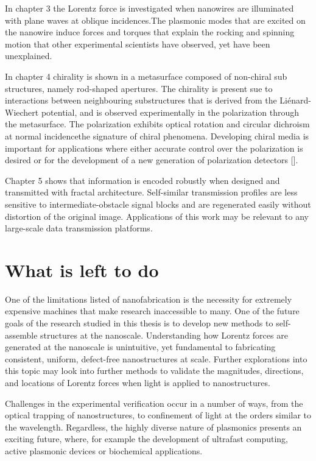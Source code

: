 In chapter 3 the Lorentz force is investigated when nanowires are illuminated with plane waves at oblique incidences.The plasmonic modes that are excited on the nanowire induce forces and torques that explain the rocking and spinning motion that other experimental scientists have observed, yet have been unexplained.

In chapter 4 chirality is shown in a metasurface composed of non-chiral sub structures, namely rod-shaped apertures.  The chirality is present sue to interactions between neighbouring substructures that is derived from the Li\'{e}nard-Wiechert potential, and is observed experimentally in the polarization through the metasurface. The polarization exhibits optical rotation and circular dichroism at normal incidence\textemdash the signature of chiral phenomena. Developing chiral media is important for applications where either accurate control over the polarization is desired or for the development of a new generation of polarization detectors [\cite{Mueller:16}].

Chapter 5 shows that information is encoded robustly when designed and transmitted with fractal architecture. Self-similar transmission profiles are less sensitive to intermediate-obstacle signal blocks and are regenerated easily without distortion of the original image. Applications of this work may be relevant to any large-scale data transmission platforms.


\section{What is left to do}
One of the limitations listed of nanofabrication is the necessity for extremely expensive machines that make research inaccessible to many. One of the future goals of the research studied in this thesis is to develop new methods to self-assemble structures at the nanoscale. Understanding how Lorentz forces are generated at the nanoscale is unintuitive, yet fundamental to fabricating consistent, uniform, defect-free nanostructures at scale. Further explorations into this topic may look into further methods to validate the magnitudes, directions, and locations of Lorentz forces when light is applied to nanostructures. 

Challenges in the experimental verification occur in a number of ways, from the optical trapping of nanostructures, to confinement of light at the orders similar to the wavelength. Regardless, the highly diverse nature of plasmonics presents an exciting future, where, for example the development of ultrafast computing, active plasmonic devices or biochemical applications.

